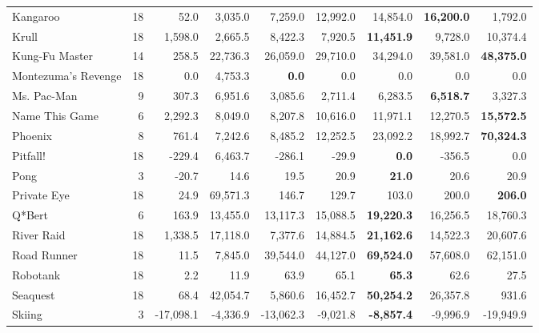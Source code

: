 \begin{table}[!b]
\begin{center}
\begin{tabular}{l|rrr|rrr|rr}
            Kangaroo &              18 &       52.0 &   3,035.0 &    7,259.0 &   12,992.0 &   14,854.0 &{\bf16,200.0}&      1,792.0 \\
               Krull &              18 &    1,598.0 &   2,665.5 &    8,422.3 &    7,920.5 &{\bf11,451.9}&    9,728.0 &     10,374.4 \\
      Kung-Fu Master &              14 &      258.5 &  22,736.3 &   26,059.0 &   29,710.0 &   34,294.0 &   39,581.0 &{\bf48,375.0}\\
 Montezuma's Revenge &              18 &        0.0 &   4,753.3 &{\bf0.0}&        0.0 &        0.0 &        0.0 &          0.0 \\
         Ms. Pac-Man &               9 &      307.3 &   6,951.6 &    3,085.6 &    2,711.4 &    6,283.5 &{\bf6,518.7}&      3,327.3 \\
      Name This Game &               6 &    2,292.3 &   8,049.0 &    8,207.8 &   10,616.0 &   11,971.1 &   12,270.5 &{\bf15,572.5}\\
             Phoenix &               8 &      761.4 &   7,242.6 &    8,485.2 &   12,252.5 &   23,092.2 &   18,992.7 &{\bf70,324.3}\\
            Pitfall! &              18 &     -229.4 &   6,463.7 &     -286.1 &      -29.9 &{\bf0.0}&     -356.5 &          0.0 \\
                Pong &               3 &      -20.7 &      14.6 &       19.5 &       20.9 &{\bf21.0}&       20.6 &         20.9 \\
         Private Eye &              18 &       24.9 &  69,571.3 &      146.7 &      129.7 &      103.0 &      200.0 &{\bf206.0}\\
              Q*Bert &               6 &      163.9 &  13,455.0 &   13,117.3 &   15,088.5 &{\bf19,220.3}&   16,256.5 &     18,760.3 \\
          River Raid &              18 &    1,338.5 &  17,118.0 &    7,377.6 &   14,884.5 &{\bf21,162.6}&   14,522.3 &     20,607.6 \\
         Road Runner &              18 &       11.5 &   7,845.0 &   39,544.0 &   44,127.0 &{\bf69,524.0}&   57,608.0 &     62,151.0 \\
            Robotank &              18 &        2.2 &      11.9 &       63.9 &       65.1 &{\bf65.3}&       62.6 &         27.5 \\
            Seaquest &              18 &       68.4 &  42,054.7 &    5,860.6 &   16,452.7 &{\bf50,254.2}&   26,357.8 &        931.6 \\
              Skiing &               3 &  -17,098.1 &  -4,336.9 &  -13,062.3 &   -9,021.8 &{\bf-8,857.4}&   -9,996.9 &    -19,949.9 \\

\end{tabular}
\end{center}
\end{table}
